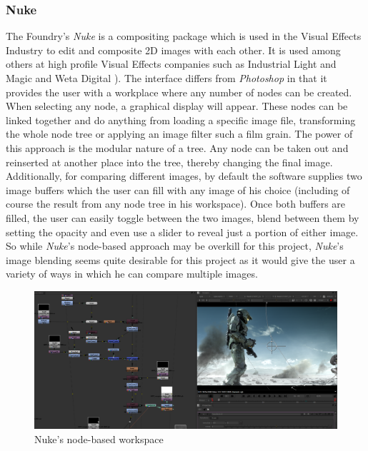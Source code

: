 \documentclass[a4paper,11pt,twoside]{article}
\begin{document}
\subsubsection{Nuke}
The Foundry's \textit{Nuke} is a compositing package which is used in the Visual Effects Industry to edit and composite 2D images with each other. It is used among others at high profile Visual Effects companies such as Industrial Light and Magic and Weta Digital\cite{nuke1} \cite{nuke2}). The interface differs from \textit{Photoshop} in that it provides the user with a workplace where any number of nodes can be created. When selecting any node, a graphical display will appear. These nodes can be linked together and do anything from loading a specific image file, transforming the whole node tree or applying an image filter such a film grain. The power of this approach is the modular nature of a tree. Any node can be taken out and reinserted at another place into the tree, thereby changing the final image. Additionally, for comparing different images, by default the software supplies two image buffers which the user can fill with any image of his choice (including of course the result from any node tree in his workspace). Once both buffers are filled, the user can easily toggle between the two images, blend between them by setting the opacity and even use a slider to reveal just a portion of either image. So while \textit{Nuke}'s node-based approach may be overkill for this project, \textit{Nuke}'s image blending seems quite desirable for this project as it would give the user a variety of ways in which he can compare multiple images. 


\begin{figure}[ht!]
\centering
\includegraphics[width=165mm]{..//literatureSurvey/graphics/nuke_02.png}
\caption{Nuke's node-based workspace}
\label{fig:UIdesign1}
\end{figure}
\end{document}
